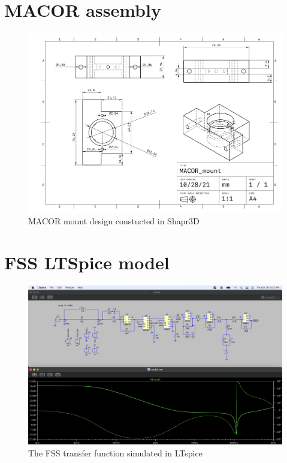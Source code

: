 \section{MACOR assembly}

\begin{figure}[H]
\includegraphics[width=\textwidth]{figs/ALGAAS/MACOR_mount.pdf}
\caption{MACOR mount design constucted in Shapr3D}


\label{fig:macor_mount_design}
\end{figure}

\section{FSS LTSpice model}

\begin{figure}[H]
\includegraphics[width=\textwidth]{figs/ALGAAS/spice_FSS_tf.png}
\caption{The FSS transfer function simulated in LTspice}
\label{fig:spiceFSS}
\end{figure}
